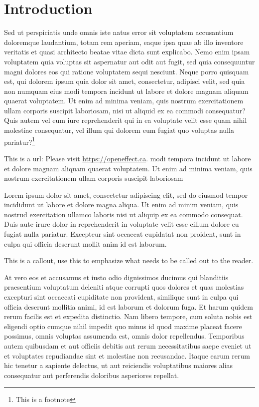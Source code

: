 \documentclass[12pt]{article}
\begin{document}
\begin{toc}
\tableofcontents
\end{toc}
\pagebreak
{}

\section*{Introduction}
\label{sec:intro}
%
Sed ut perspiciatis unde omnis iste natus error sit voluptatem accusantium doloremque laudantium, totam rem aperiam, eaque ipsa quae ab illo inventore veritatis et quasi architecto beatae vitae dicta sunt explicabo. Nemo enim ipsam voluptatem quia voluptas sit aspernatur aut odit aut fugit, sed quia consequuntur magni dolores eos qui ratione voluptatem sequi nesciunt. Neque porro quisquam est, qui dolorem ipsum quia dolor sit amet, consectetur, adipisci velit, sed quia non numquam eius modi tempora incidunt ut labore et dolore magnam aliquam quaerat voluptatem. Ut enim ad minima veniam, quis nostrum exercitationem ullam corporis suscipit laboriosam, nisi ut aliquid ex ea commodi consequatur? Quis autem vel eum iure reprehenderit qui in ea voluptate velit esse quam nihil molestiae consequatur, vel illum qui dolorem eum fugiat quo voluptas nulla pariatur?\footnote{This is a footnote}

This is a url: Please visit \url{https://openeffect.ca}. modi tempora incidunt ut labore et dolore magnam aliquam quaerat voluptatem. Ut enim ad minima veniam, quis nostrum exercitationem ullam corporis suscipit laboriosam

Lorem ipsum dolor sit amet, consectetur adipiscing elit, sed do eiusmod tempor incididunt ut labore et dolore magna aliqua. Ut enim ad minim veniam, quis nostrud exercitation ullamco laboris nisi ut aliquip ex ea commodo consequat. Duis aute irure dolor in reprehenderit in voluptate velit esse cillum dolore eu fugiat nulla pariatur. Excepteur sint occaecat cupidatat non proident, sunt in culpa qui officia deserunt mollit anim id est laborum.

\begin{mdframed}[style=oeCallout]
This is a callout, use this to emphasize what needs to be called out to the reader.
\end{mdframed}

At vero eos et accusamus et iusto odio dignissimos ducimus qui blanditiis praesentium voluptatum deleniti atque corrupti quos dolores et quas molestias excepturi sint occaecati cupiditate non provident, similique sunt in culpa qui officia deserunt mollitia animi, id est laborum et dolorum fuga. Et harum quidem rerum facilis est et expedita distinctio. Nam libero tempore, cum soluta nobis est eligendi optio cumque nihil impedit quo minus id quod maxime placeat facere possimus, omnis voluptas assumenda est, omnis dolor repellendus. Temporibus autem quibusdam et aut officiis debitis aut rerum necessitatibus saepe eveniet ut et voluptates repudiandae sint et molestiae non recusandae. Itaque earum rerum hic tenetur a sapiente delectus, ut aut reiciendis voluptatibus maiores alias consequatur aut perferendis doloribus asperiores repellat.
\end{document}
